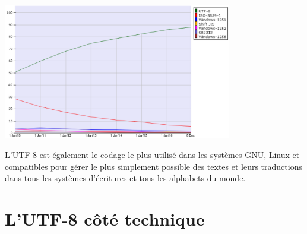 \begin{center}
    \includegraphics[width=10cm]{img/UTF8evol}
\end{center}

L'UTF-8 est également le codage le plus utilisé dans les systèmes GNU, Linux et compatibles pour gérer le plus simplement
possible des textes et leurs traductions dans tous les systèmes d'écritures et tous les alphabets du monde.\\

\section{L'UTF-8 côté technique}

